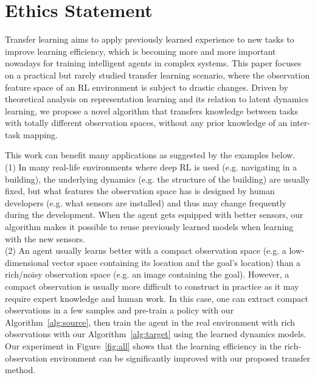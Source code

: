 \section*{Ethics Statement}

Transfer learning aims to apply previously learned experience to new tasks to improve learning efficiency, which is becoming more and more important nowadays for training intelligent agents in complex systems.
This paper focuses on a practical but rarely studied transfer learning scenario, where the observation feature space of an RL environment is subject to drastic changes. Driven by theoretical analysis on representation learning and its relation to latent dynamics learning, we propose a novel algorithm that transfers knowledge between tasks with totally different observation spaces, without any prior knowledge of an inter-task mapping.

This work can benefit many applications as suggested by the examples below. \\
(1) In many real-life environments where deep RL is used (e.g. navigating in a building), the underlying dynamics (e.g. the structure of the building) are usually fixed, but what features the observation space has is designed by human developers (e.g. what sensors are installed) and thus may change frequently during the development. When the agent gets equipped with better sensors, our algorithm makes it possible to reuse previously learned models when learning with the new sensors. \\
(2) An agent usually learns better with a compact observation space (e.g. a low-dimensional vector space containing its location and the goal's location) than a rich/noisy observation space (e.g. an image containing the goal). However, a compact observation is usually more difficult to construct in practice as it may require expert knowledge and human work. In this case, one can extract compact observations in a few samples and pre-train a policy with our Algorithm~\ref{alg:source}, then train the agent in the real environment with rich observations with our Algorithm~\ref{alg:target} using the learned dynamics models. Our experiment in Figure~\ref{fig:all} shows that the learning efficiency in the rich-observation environment can be significantly improved with our proposed transfer method.



